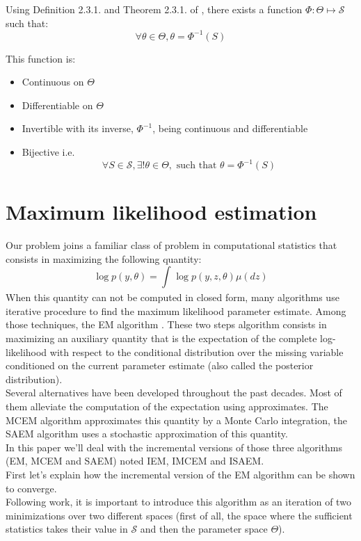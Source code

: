 \documentclass{article}
\theoremstyle{plain}
\theoremstyle{plain}
\theoremstyle{definition}
\begin{document}
Using Definition 2.3.1. and Theorem 2.3.1. of \citep{robert}, there exists a function $\Phi: \Theta \mapsto \mathcal{S}$ such that:
\begin{equation}
\forall \theta \in \Theta, \theta = \Phi^{-1}(S)
\end{equation}

This function is:
\begin{itemize}
\item Continuous on $\Theta$
\item Differentiable on $\Theta$
\item Invertible with its inverse, $\Phi^{-1}$, being continuous and differentiable
\item Bijective i.e.
\begin{equation}
\forall S \in \mathcal{S}, \exists! \theta \in \Theta, \textrm{ such that } \theta = \Phi^{-1}(S)
\end{equation}
\end{itemize}



\section{Maximum likelihood estimation}
Our problem joins a familiar class of problem in computational statistics that consists in maximizing the following quantity:
\begin{equation}
\log p(y,\theta) = \int_{}{\log p(y,z,\theta)\mu(dz)}
\end{equation}
When this quantity can not be computed in closed form, many algorithms use iterative procedure to find the maximum likelihood parameter estimate. Among those techniques, the EM algorithm \citep{dempster}. These two steps algorithm consists in maximizing an auxiliary quantity that is the expectation of the complete log-likelihood with respect to the conditional distribution over the missing variable conditioned on the current parameter estimate (also called the posterior distribution).\\
Several alternatives have been developed throughout the past decades. Most of them alleviate the computation of the expectation using approximates. The MCEM algorithm \citep{diebolt} approximates this quantity by a Monte Carlo integration, the SAEM algorithm \citep{lavielle} uses a stochastic approximation of this quantity.\\
In this paper we'll deal with the incremental versions of those three algorithms (EM, MCEM and SAEM) noted IEM, IMCEM and ISAEM.
\\
First let's explain how the incremental version of the EM algorithm can be shown to converge.\\
Following \citep{byrne} work, it is important to introduce this algorithm as an iteration of two minimizations over two different spaces (first of all, the space where the sufficient statistics takes their value in $\mathcal{S}$ and then the parameter space $\Theta$).
\end{document}
